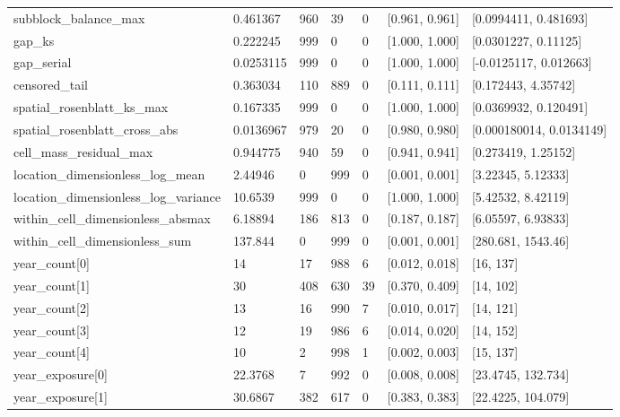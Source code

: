 \begin{longtable}
{}subblock\_\allowbreak{}balance\_\allowbreak{}max & 0.461367 & 960 & 39 & 0 & [0.961, 0.961] & [0.0994411, 0.481693] \\
{}gap\_\allowbreak{}ks & 0.222245 & 999 & 0 & 0 & [1.000, 1.000] & [0.0301227, 0.11125] \\
{}gap\_\allowbreak{}serial & 0.0253115 & 999 & 0 & 0 & [1.000, 1.000] & [-0.0125117, 0.012663] \\
{}censored\_\allowbreak{}tail & 0.363034 & 110 & 889 & 0 & [0.111, 0.111] & [0.172443, 4.35742] \\
{}spatial\_\allowbreak{}rosenblatt\_\allowbreak{}ks\_\allowbreak{}max & 0.167335 & 999 & 0 & 0 & [1.000, 1.000] & [0.0369932, 0.120491] \\
{}spatial\_\allowbreak{}rosenblatt\_\allowbreak{}cross\_\allowbreak{}abs & 0.0136967 & 979 & 20 & 0 & [0.980, 0.980] & [0.000180014, 0.0134149] \\
{}cell\_\allowbreak{}mass\_\allowbreak{}residual\_\allowbreak{}max & 0.944775 & 940 & 59 & 0 & [0.941, 0.941] & [0.273419, 1.25152] \\
{}location\_\allowbreak{}dimensionless\_\allowbreak{}log\_\allowbreak{}mean & 2.44946 & 0 & 999 & 0 & [0.001, 0.001] & [3.22345, 5.12333] \\
{}location\_\allowbreak{}dimensionless\_\allowbreak{}log\_\allowbreak{}variance & 10.6539 & 999 & 0 & 0 & [1.000, 1.000] & [5.42532, 8.42119] \\
{}within\_\allowbreak{}cell\_\allowbreak{}dimensionless\_\allowbreak{}absmax & 6.18894 & 186 & 813 & 0 & [0.187, 0.187] & [6.05597, 6.93833] \\
{}within\_\allowbreak{}cell\_\allowbreak{}dimensionless\_\allowbreak{}sum & 137.844 & 0 & 999 & 0 & [0.001, 0.001] & [280.681, 1543.46] \\
{}year\_\allowbreak{}count[0] & 14 & 17 & 988 & 6 & [0.012, 0.018] & [16, 137] \\
{}year\_\allowbreak{}count[1] & 30 & 408 & 630 & 39 & [0.370, 0.409] & [14, 102] \\
{}year\_\allowbreak{}count[2] & 13 & 16 & 990 & 7 & [0.010, 0.017] & [14, 121] \\
{}year\_\allowbreak{}count[3] & 12 & 19 & 986 & 6 & [0.014, 0.020] & [14, 152] \\
{}year\_\allowbreak{}count[4] & 10 & 2 & 998 & 1 & [0.002, 0.003] & [15, 137] \\
{}year\_\allowbreak{}exposure[0] & 22.3768 & 7 & 992 & 0 & [0.008, 0.008] & [23.4745, 132.734] \\
{}year\_\allowbreak{}exposure[1] & 30.6867 & 382 & 617 & 0 & [0.383, 0.383] & [22.4225, 104.079] \\

\end{longtable}

